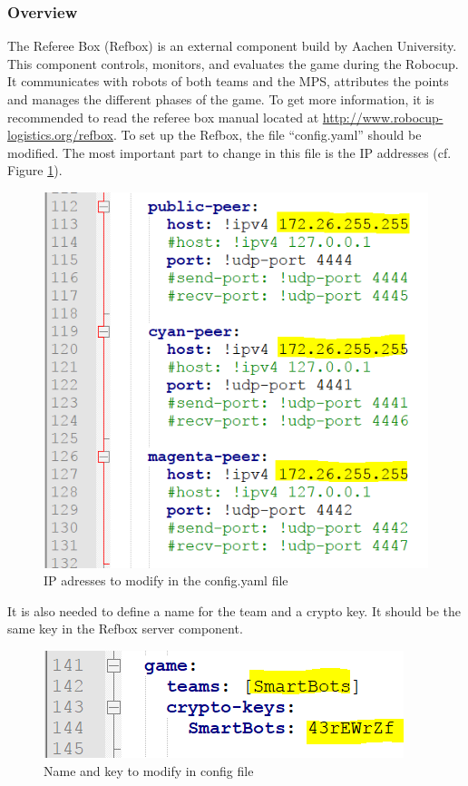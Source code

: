 
\subsubsection{Overview}

The Referee Box (Refbox) is an external component build by Aachen University. This component controls, monitors, and evaluates the game during the Robocup. It communicates with robots of both teams and the MPS, attributes the points and manages the different phases of the game. To get more information, it is recommended to read the referee box manual located at \url{http://www.robocup-logistics.org/refbox}. To set up the Refbox, the file “config.yaml” should be modified. The most important part to change in this file is the IP addresses (cf. Figure \ref{fig:configFile1}). \\

\begin{figure}[!h]
\centering
\includegraphics[]{pic/config_file_1.png}
\caption{IP adresses to modify in the config.yaml file}
\label{fig:configFile1}
\end{figure}

It is also needed to define a name for the team and a crypto key. It should be the same key in the Refbox server component.

\begin{figure}[!h]
\centering
\includegraphics[]{pic/config_file_2.png}
\caption{Name and key to modify in config file}
\label{fig:configFile2}
\end{figure}

